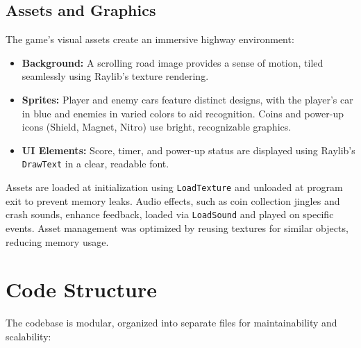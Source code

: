 \documentclass[12pt,a4paper]{article}
\begin{document}
\subsection{Assets and Graphics}

The game’s visual assets create an immersive highway environment: \\

\begin{itemize}
    \item \textbf{Background:} A scrolling road image provides a sense of motion, tiled seamlessly using Raylib’s texture rendering. \\
    \item \textbf{Sprites:} Player and enemy cars feature distinct designs, with the player’s car in blue and enemies in varied colors to aid recognition. Coins and power-up icons (Shield, Magnet, Nitro) use bright, recognizable graphics. \\
    \item \textbf{UI Elements:} Score, timer, and power-up status are displayed using Raylib’s \texttt{DrawText} in a clear, readable font. \\
\end{itemize}

Assets are loaded at initialization using \texttt{LoadTexture} and unloaded at program exit to prevent memory leaks. Audio effects, such as coin collection jingles and crash sounds, enhance feedback, loaded via \texttt{LoadSound} and played on specific events. Asset management was optimized by reusing textures for similar objects, reducing memory usage. \\

\section{Code Structure}

The codebase is modular, organized into separate files for maintainability and scalability: \\
\end{document}

